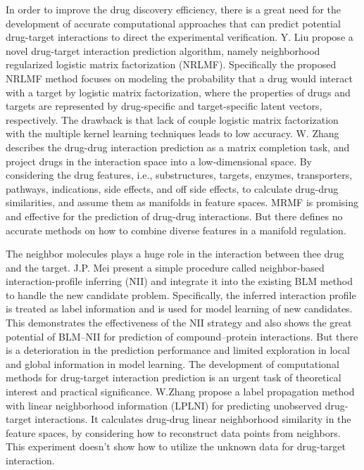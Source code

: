 \documentclass[conference]{IEEEtran}
\begin{document}
In order to improve the drug discovery efficiency, there is a great need for the development of accurate computational approaches that can predict potential drug-target interactions to direct the experimental verification. Y. Liu \cite{b17} propose a novel drug-target interaction prediction algorithm, namely neighborhood regularized logistic matrix factorization (NRLMF). Specifically the proposed NRLMF method focuses on modeling the probability that a drug would interact with a target by logistic matrix factorization, where the properties of drugs and targets are represented by drug-specific and target-specific latent vectors, respectively.  The drawback is that lack of couple logistic matrix factorization with the multiple kernel learning techniques leads to low accuracy. W. Zhang \cite{b13} describes the drug-drug interaction prediction as a matrix completion task, and project drugs in the interaction space into a low-dimensional space. By considering the drug features, i.e., substructures, targets, enzymes, transporters, pathways, indications, side effects, and off side effects, to calculate drug-drug similarities, and assume them as manifolds in feature spaces. MRMF is promising and effective for the prediction of drug-drug interactions. But there defines no accurate methods on how to combine diverse features in a manifold regulation.

The neighbor molecules plays a huge role in the interaction between thee drug and the target. J.P. Mei \cite{b3} present a simple procedure called neighbor-based interaction-profile inferring (NII) and integrate it into the existing BLM method to handle the new candidate problem. Specifically, the inferred interaction profile is treated as label information and is used for model learning of new candidates. This demonstrates the effectiveness of the NII strategy and also shows the great potential of BLM–NII for prediction of compound–protein interactions. But there is a deterioration in the prediction performance and limited exploration in local and global information in model learning. The development of computational methods for drug-target interaction prediction is an urgent task of theoretical interest and practical significance. W.Zhang \cite{b14} propose a label propagation method with linear neighborhood information (LPLNI) for predicting unobserved drug-target interactions. It calculates drug-drug linear neighborhood similarity in the feature spaces, by considering how to reconstruct data points from neighbors. This experiment doesn’t show how to utilize the unknown data for drug-target interaction.
\end{document}
